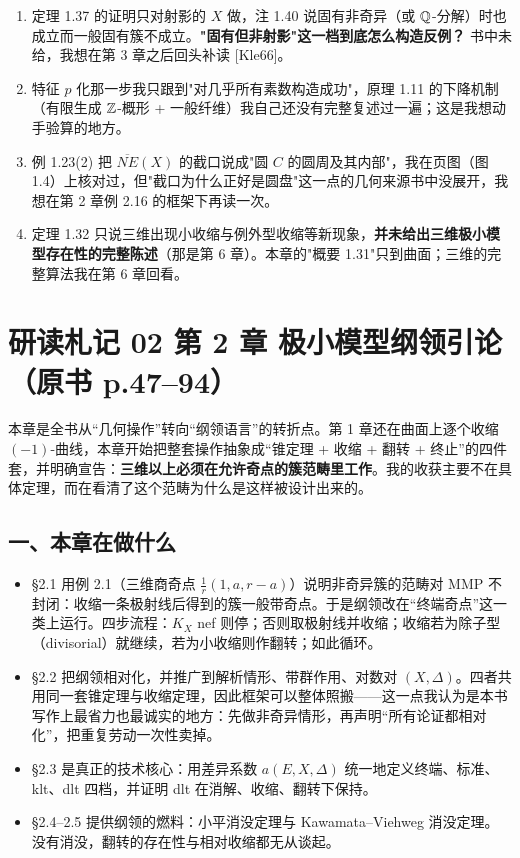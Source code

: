 \begin{enumerate}
\item 定理 1.37 的证明只对射影的 $X$ 做，注 1.40 说固有非奇异（或 $\mathbb{Q}$-分解）时也成立而一般固有簇不成立。\textbf{"固有但非射影"这一档到底怎么构造反例？} 书中未给，我想在第 3 章之后回头补读 [Kle66]。
\item 特征 $p$ 化那一步我只跟到"对几乎所有素数构造成功"，原理 1.11 的下降机制（有限生成 $\mathbb{Z}$-概形 + 一般纤维）我自己还没有完整复述过一遍；这是我想动手验算的地方。
\item 例 1.23(2) 把 $\overline{NE}(X)$ 的截口说成"圆 $C$ 的圆周及其内部"，我在页图（图 1.4）上核对过，但"截口为什么正好是圆盘"这一点的几何来源书中没展开，我想在第 2 章例 2.16 的框架下再读一次。
\item 定理 1.32 只说三维出现小收缩与例外型收缩等新现象，\textbf{并未给出三维极小模型存在性的完整陈述}（那是第 6 章）。本章的"概要 1.31"只到曲面；三维的完整算法我在第 6 章回看。
\end{enumerate}

\section*{研读札记 02 \textperiodcentered{} 第 2 章 极小模型纲领引论（原书 p.47--94）}

本章是全书从“几何操作”转向“纲领语言”的转折点。第 1 章还在曲面上逐个收缩 $(-1)$-曲线，本章开始把整套操作抽象成“锥定理 + 收缩 + 翻转 + 终止”的四件套，并明确宣告：\textbf{三维以上必须在允许奇点的簇范畴里工作}。我的收获主要不在具体定理，而在看清了这个范畴为什么是这样被设计出来的。

\subsection*{一、本章在做什么}

\begin{itemize}
\item \S2.1 用例 2.1（三维商奇点 $\frac{1}{r}(1,a,r-a)$）说明非奇异簇的范畴对 MMP 不封闭：收缩一条极射线后得到的簇一般带奇点。于是纲领改在“终端奇点”这一类上运行。四步流程：$K_X$ nef 则停；否则取极射线并收缩；收缩若为除子型（divisorial）就继续，若为小收缩则作翻转；如此循环。
\item \S2.2 把纲领相对化，并推广到解析情形、带群作用、对数对 $(X,\Delta)$。四者共用同一套锥定理与收缩定理，因此框架可以整体照搬——这一点我认为是本书写作上最省力也最诚实的地方：先做非奇异情形，再声明“所有论证都相对化”，把重复劳动一次性卖掉。
\item \S2.3 是真正的技术核心：用差异系数 $a(E,X,\Delta)$ 统一地定义终端、标准、klt、dlt 四档，并证明 dlt 在消解、收缩、翻转下保持。
\item \S2.4--2.5 提供纲领的燃料：小平消没定理与 Kawamata--Viehweg 消没定理。没有消没，翻转的存在性与相对收缩都无从谈起。
\end{itemize}

